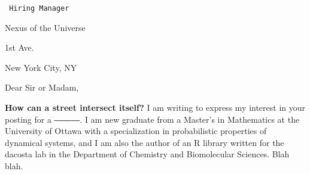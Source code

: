 
{\tt
\noindent Hiring Manager \par
\noindent Nexus of the Universe \par
{} 1st Ave. \par
\noindent New York City, NY \par
}
\canadafalse

\vskip 0.9cm


\noindent
Dear Sir or Madam, \bigskip

{\bf How can a street intersect itself?} I am writing to express my interest in your posting for a {\tt ------------------}. I am new graduate from a Master's in Mathematics at the University of Ottawa with a specialization in probabilistic properties of dynamical systems, and I am also the author of an R library written for the dacosta lab in the Department of Chemistry and Biomolecular Sciences. Blah blah.

\medskip


